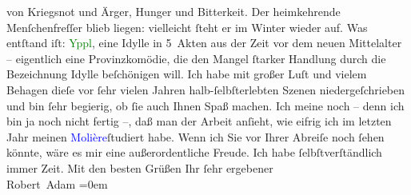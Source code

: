                     von Kriegsnot und Ärger, Hunger und Bitterkeit. Der heimkehrende Menſchenfreſſer
                    blieb liegen: vielleicht ſteht er im Winter wieder auf. Was entſtand iſt: \textcolor{green}{Yppl}{}\ledrightnote{\textcolor{green}{Yppl. Idylle in fünf Akten}}, eine Idylle in 5 Akten aus der Zeit vor
                    dem neuen Mittelalter – eigentlich eine Provinzkomödie, die den Mangel ſtarker
                    Handlung durch die Bezeichnung Idylle beſchönigen will. Ich habe mit großer Luſt
                    und vielem Behagen dieſe vor ſehr vielen Jahren halb-ſelbſterlebten Szenen
                    niedergeſchrieben und bin ſehr begierig, ob ſie auch Ihnen Spaß machen. Ich
                    meine noch – denn ich bin ja noch nicht fertig –, daß man der Arbeit anſieht,
                    wie eifrig ich im letzten Jahr meinen \textcolor{blue}{Molière}{}\ledrightnote{\textcolor{blue}{Molière}}{ }ſtudiert habe.\pend
           \pstart
           {\pb}Wenn ich Sie vor Ihrer Abreiſe noch
                    ſehen könnte, wäre es mir \introOben{}eine\introOben{} außerordentliche Freude.
                    Ich habe ſelbſtverſtändlich immer Zeit.\pend
           \pstart
           Mit den besten Grüßen Ihr ſehr ergebener{\\[\baselineskip]}\spacefill\mbox{Robert Adam}\pend
           \leftskip=0em{}\endnumbering{}  
      